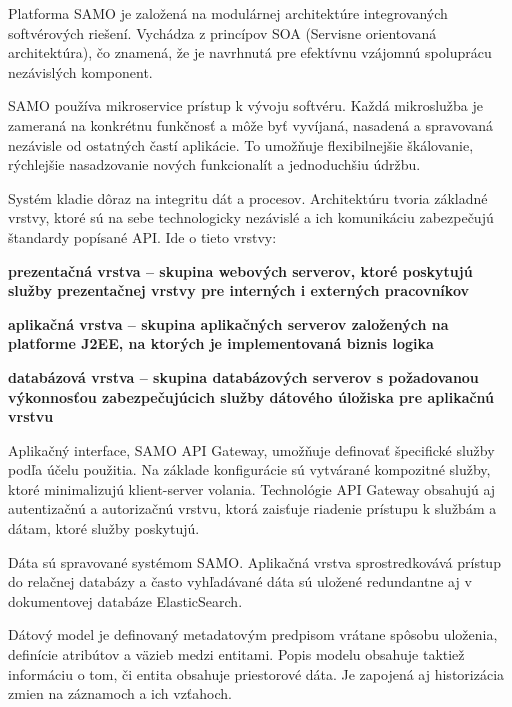 Platforma SAMO je založená na modulárnej architektúre integrovaných softvérových riešení. Vychádza z princípov SOA (Servisne orientovaná architektúra), čo znamená, že je navrhnutá pre efektívnu vzájomnú spoluprácu nezávislých komponent. %

SAMO používa mikroservice prístup k vývoju softvéru. Každá mikroslužba je zameraná na konkrétnu funkčnosť a môže byť vyvíjaná, nasadená a spravovaná nezávisle od ostatných častí aplikácie. To umožňuje flexibilnejšie škálovanie, rýchlejšie nasadzovanie nových funkcionalít a jednoduchšiu údržbu. %

\blank
Systém kladie dôraz na integritu dát a procesov. Architektúru tvoria základné vrstvy, ktoré sú na sebe technologicky nezávislé a ich komunikáciu zabezpečujú štandardy popísané API. Ide o tieto vrstvy:

\startitemize[n]
\item \start\bf prezentačná vrstva \stop -- skupina webových serverov, ktoré poskytujú služby prezentačnej vrstvy pre interných i externých pracovníkov
\item \start\bf aplikačná vrstva \stop -- skupina aplikačných serverov založených na platforme J2EE, na ktorých je implementovaná biznis logika
\item  \start\bf databázová vrstva \stop -- skupina databázových serverov s požadovanou výkonnosťou zabezpečujúcich služby dátového úložiska pre aplikačnú vrstvu
\stopitemize

Aplikačný interface, SAMO API Gateway, umožňuje definovať špecifické služby podľa účelu použitia. Na základe konfigurácie sú vytvárané kompozitné služby, ktoré minimalizujú klient-server volania. Technológie API Gateway obsahujú aj autentizačnú a autorizačnú vrstvu, ktorá zaisťuje riadenie prístupu k službám a dátam, ktoré služby poskytujú.

Dáta sú spravované systémom SAMO. Aplikačná vrstva sprostredkovává prístup do relačnej databázy a často vyhľadávané dáta sú uložené redundantne aj v dokumentovej databáze ElasticSearch. 

Dátový model je definovaný metadatovým predpisom vrátane spôsobu uloženia, definície atribútov a väzieb medzi entitami. Popis modelu obsahuje taktiež informáciu o tom, či entita obsahuje priestorové dáta. Je zapojená aj historizácia zmien na záznamoch a ich vzťahoch.

